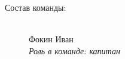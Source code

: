 \large Состав команды:


\begin{figure}[H]
	\begin{minipage}[h]{0.47\linewidth}
		\\
		Фокин Иван\\
		\emph{Роль в команде: капитан} 
	\end{minipage}
	\hfill
	\begin{minipage}[h]{0.47\linewidth}

\end{minipage}
\end{figure}
